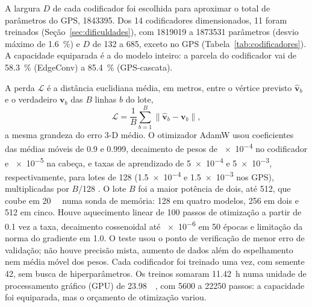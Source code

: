 A largura $D$ de cada codificador foi escolhida \cite{dwivedi2023benchmarking} para aproximar o total de parâmetros do GPS, \num{1843395}. Dos \num{14} codificadores dimensionados, \num{11} foram treinados (Seção~\ref{sec:dificuldades}), com \num{1819019} a \num{1873531} parâmetros (desvio máximo de \qty{1.6}{\percent}) e $D$ de \num{132} a \num{685}, exceto no GPS (Tabela~\ref{tab:codificadores}). A capacidade equiparada é a do modelo inteiro: a parcela do codificador vai de \qty{58.3}{\percent} (EdgeConv) a \qty{85.4}{\percent} (\mbox{GPS-cascata}).

A perda $\mathcal{L}$ é a distância euclidiana média, em metros, entre o vértice previsto $\hat{\mathbf{v}}_b$ e o verdadeiro $\mathbf{v}_b$ das $B$ linhas $b$ do lote,
\begin{equation}
  \mathcal{L} = \frac{1}{B} \sum_{b=1}^{B} \big\lVert \hat{\mathbf{v}}_b - \mathbf{v}_b \big\rVert,
  \label{eq:perda}
\end{equation}
a mesma grandeza do erro 3-D médio. O otimizador AdamW \cite{loshchilov2019decoupled} usou coeficientes das médias móveis de \num{0.9} e \num{0.999}, decaimento de pesos de \num{e-4} no codificador e \num{e-5} na cabeça, e taxas de aprendizado de \num{5e-4} e \num{5e-3}, respectivamente, para lotes de \num{128} (\num{1.5e-4} e \num{1.5e-3} nos GPS), multiplicadas por $B$/\num{128} \cite{goyal2017accurate}. O lote $B$ foi a maior potência de dois, até \num{512}, que coube em \qty{20}{\gibi\byte} numa sonda de memória: \num{128} em quatro modelos, \num{256} em dois e \num{512} em cinco. Houve aquecimento linear de \num{100} passos de otimização a partir de \num{0.1} vez a taxa, decaimento cossenoidal até \num{e-6} em \num{50} épocas \cite{loshchilov2017sgdr} e limitação da norma do gradiente em \num{1.0}. O teste usou o ponto de verificação de menor erro de validação; não houve precisão mista, aumento de dados além do espelhamento nem média móvel dos pesos. Cada codificador foi treinado uma vez, com semente \num{42}, sem busca de hiperparâmetros. Os treinos somaram \qty{11.42}{\hour} numa unidade de processamento gráfico (GPU) de \qty{23.98}{\gibi\byte}, com \num{5600} a \num{22250} passos: a capacidade foi equiparada, mas o orçamento de otimização variou.
